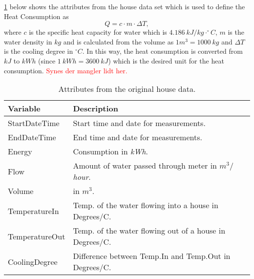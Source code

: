 \noindent \cref{tab: housedata} below shows the attributes from the house data set which is used to define the Heat Consumption as
\begin{equation}
    Q = c\cdot m \cdot \Delta T,
    \label{eq: Q_heat}
\end{equation}
where $c$ is the specific heat capacity for water which is $4.186 \ kJ/kg\cdot ^{\circ}C$, $m$ is the water density in $kg$ and is calculated from the volume as $1m^3 = 1000 \ kg$ and $\Delta T$ is the cooling degree in $^{\circ}C$. In this way, the heat consumption is converted from $kJ$ to $kWh$ (since $1 \ kWh = 3600 \ kJ$) which is the desired unit for the heat consumption. \textcolor{red}{Synes der mangler lidt her.}
\begin{table}[H]
    \centering
    \begin{tabular}{ll}
     \hline
     \textbf{Variable} & \textbf{Description} \\
    \hline
    \hline
    StartDateTime  &  Start time and date for measurements.\\
    EndDateTime  &  End time and date for measurements.\\
    Energy  &  Consumption in \textit{kWh}.\\
    Flow  &  Amount of water passed through meter in \textit{$m^3/$hour}.\\
    Volume & in $m^3$.\\
    TemperatureIn  &  Temp. of the water flowing into a house in Degrees/C. \\
    TemperatureOut  & Temp. of the water flowing out of a house in Degrees/C.\\
    CoolingDegree  &  Difference between Temp.In and Temp.Out in Degrees/C. \\
    \hline
    \end{tabular}
    \caption{Attributes from the original house data.}
    \label{tab: housedata}
\end{table}

